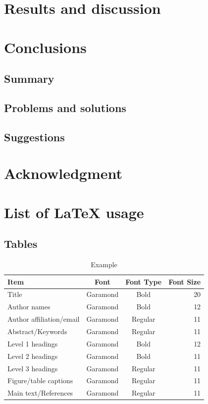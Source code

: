 \documentclass[11pt,a4paper]{article}
\begin{document}
\section{Results and discussion}

\section{Conclusions}

\subsection{Summary}

\subsection{Problems and solutions}

\subsection{Suggestions}

\section{Acknowledgment}

\section{List of LaTeX usage}

\subsection{Tables}
\begin{table}[ht]
\centering
\caption{Example} 
\vspace{3mm}
\begin{tabular}{|l|c|c|r|} \hline
Item & Font & Font Type & Font Size \\ \hline
Title & Garamond & Bold & 20 \\
Author names & Garamond & Bold & 12 \\ 
Author affiliation/email & Garamond & Regular & 11 \\
Abstract/Keywords & Garamond & Regular & 11 \\
Level 1 headings & Garamond & Bold & 12 \\
Level 2 headings & Garamond & Bold & 11 \\
Level 3 headings & Garamond & Regular & 11 \\
Figure/table captions & Garamond & Regular & 11 \\
Main text/References & Garamond & Regular & 11 \\ \hline
\end{tabular}
\end{table}
\end{document}
